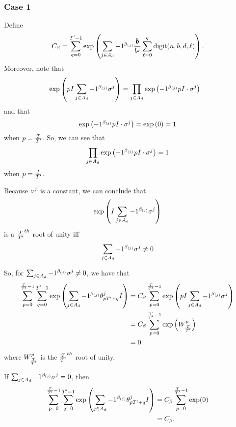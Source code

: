 \subsubsection*{Case 1}
Define
$$
  C_\beta = \sum_{q = 0}^{{T}' - 1}
  \exp\left(
      \sum_{j \in A_d} -1 ^ {\beta_{(j)}} \frac{\pmb{b}}{b^j}
        \sum_{\ell = 0}^{q}\mathrm{digit}(n, b, d, \ell)
  \right).
$$
Moreover, note that 
\begin{align*}
  &\exp\left(
      pI \sum_{j \in A_d} -1 ^ {\beta_{(j)}}
      \sigma^j
    \right)
  = \prod_{j \in A_d} \exp\left(-1^{\beta_{(j)}} pI \cdot \sigma^j \right)
\end{align*}
and that 
\begin{equation*}
  \exp\left(-1^{\beta_{(j)}} pI \cdot \sigma^j \right) = \exp\left(0\right) = 1
\end{equation*}
when $p = \frac{T}{{T}'}$. So, we can see that
$$
\prod_{j \in A_d} \exp\left(-1^{\beta_{(j)}} pI \cdot \sigma^j \right) = 1
$$
when $p = \frac{T}{{T}'}$.

Because $\sigma^j$ is a constant, we can conclude that
\begin{equation*}
 \exp\left(
      I \sum_{j \in A_d} -1 ^ {\beta_{(j)}}
      \sigma^j
    \right) 
\end{equation*}
is a $\frac{T}{{T}'}^{th}$ root of unity iff 
$$\sum_{j \in A_d} -1 ^ {\beta_{(j)}}\sigma^j \neq 0$$

So, for $\sum_{j \in A_d} -1 ^ {\beta_{(j)}}\sigma^j \neq 0$, we have that
\begin{align*}
  \sum_{p= 0}^{\frac{T}{{T}'} - 1} \sum_{q = 0}^{{T}' - 1} \exp\left( \sum_{j \in A_d} -1 ^ {\beta_{(j)}} {\theta^j_{p {T}' + q}}I \right) &= C_\beta \sum_{p= 0}^{\frac{T}{{T}'} - 1}
    \exp\left(
      pI \sum_{j \in A_d} -1 ^ {\beta_{(j)}}
      \sigma^j
    \right) \\
    &= C_\beta \sum_{p = 0}^{\frac{T}{{T}'} - 1}\exp\left(W_{\frac{T}{{T}'}}^p\right) \\
    &= 0.
\end{align*}
where $W_{\frac{T}{{T}'}}^p$ is the $\frac{T}{{T}'}^{th}$ root of unity.

If $\sum_{j \in A_d} -1 ^ {\beta_{(j)}} \sigma^j = 0$, then 
\begin{align*}
  \sum_{p= 0}^{\frac{T}{{T}'} - 1} \sum_{q = 0}^{{T}' - 1} \exp\left( \sum_{j \in A_d} -1 ^ {\beta_{(j)}} {\theta^j_{p {T}' + q}}I \right) &= C_\beta \sum_{p= 0}^{\frac{T}{{T}'} - 1} \exp(0) \\
  &= C_\beta.
\end{align*}

